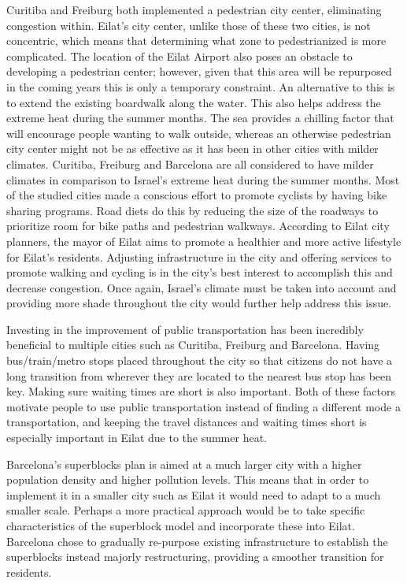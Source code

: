 \documentclass[12pt]{article}                               %
\begin{document}
Curitiba and Freiburg both implemented a pedestrian city center, eliminating congestion within. Eilat's city center, unlike those of these two cities, is not concentric, which means that determining what zone to pedestrianized is more complicated. The location of the Eilat Airport also poses an obstacle to developing a pedestrian center; however, given that this area will be repurposed in the coming years this is only a temporary constraint. An alternative to this is to extend the existing boardwalk along the water. This also helps address the extreme heat during the summer months. The sea provides a chilling factor that will encourage people wanting to walk outside, whereas an otherwise pedestrian city center might not be as effective as it has been in other cities with milder climates. Curitiba, Freiburg and Barcelona are all considered to have milder climates in comparison to Israel's extreme heat during the summer months. Most of the studied cities made a conscious effort to promote cyclists by having bike sharing programs. Road diets do this by reducing the size of the roadways to prioritize room for bike paths and pedestrian walkways. According to Eilat city planners, the mayor of Eilat aims to promote a healthier and more active lifestyle for Eilat's residents. Adjusting infrastructure in the city and offering services to promote walking and cycling is in the city's best interest to accomplish this and decrease congestion. Once again, Israel's climate must be taken into account and providing more shade throughout the city would further help address this issue. 

Investing in the improvement of public transportation has been incredibly beneficial to multiple cities such as Curitiba, Freiburg and Barcelona. Having bus/train/metro stops placed throughout the city so that citizens do not have a long transition from wherever they are located to the nearest bus stop has been key. Making sure waiting times are short is also important. Both of these factors motivate people to use public transportation instead of finding a different mode a transportation, and keeping the travel distances and waiting times short is especially important in Eilat due to the summer heat. 

Barcelona's superblocks plan is aimed at a much larger city with a higher population density and higher pollution levels. This means that in order to implement it in a smaller city such as Eilat it would need to adapt to a much smaller scale. Perhaps a more practical approach would be to take specific characteristics of the superblock model and incorporate these into Eilat. Barcelona chose to gradually re-purpose existing infrastructure to establish the superblocks instead majorly restructuring, providing a smoother transition for residents. 
\end{document}

